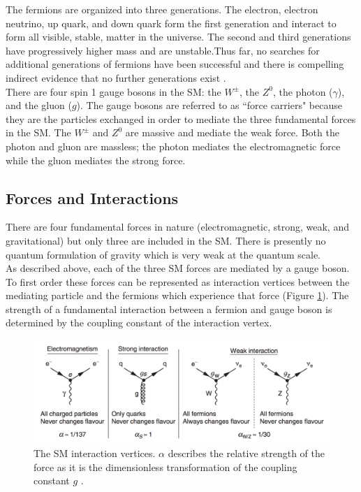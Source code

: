 The fermions are organized into three generations. The electron, electron neutrino, up quark, and down quark form the first generation and interact to form all visible, stable, matter in the universe. The second and third generations have progressively higher mass and are unstable.\footnotemark[1] Thus far, no searches for additional generations of fermions have been successful and there is compelling indirect evidence that no further generations exist \cite{neutrino_species}.\\ 

There are four spin 1 gauge bosons in the SM: the $W^{\pm}$, the $Z^0$, the photon ($\gamma$), and the gluon ($g$). The gauge bosons are referred to as ``force carriers" because they are the particles exchanged in order to mediate the three fundamental forces in the SM. The $W^{\pm}$ and $Z^0$ are massive and mediate the weak force. Both the photon and gluon are massless; the photon mediates the electromagnetic force while the gluon mediates the strong force.

\subsection{Forces and Interactions}\label{sec:forces}
There are four fundamental forces in nature (electromagnetic, strong, weak, and gravitational) but only three are included in the SM. There is presently no quantum formulation of gravity which is very weak at the quantum scale.\\

As described above, each of the three SM forces are mediated by a gauge boson. To first order these forces can be represented as interaction vertices between the mediating particle and the fermions which experience that force (Figure \ref{fig:vertices}). The strength of a fundamental interaction between a fermion and gauge boson is determined by the coupling constant of the interaction vertex.\\

\begin{figure}[h]
    \centering
    \includegraphics[width=5in]{figures/chapter1/sm_vertices.png}
    \caption{The SM interaction vertices. $\alpha$ describes the relative strength of the force as it is the dimensionless transformation of the coupling constant $g$ \cite{thomson}.}
    \label{fig:vertices}
\end{figure}

